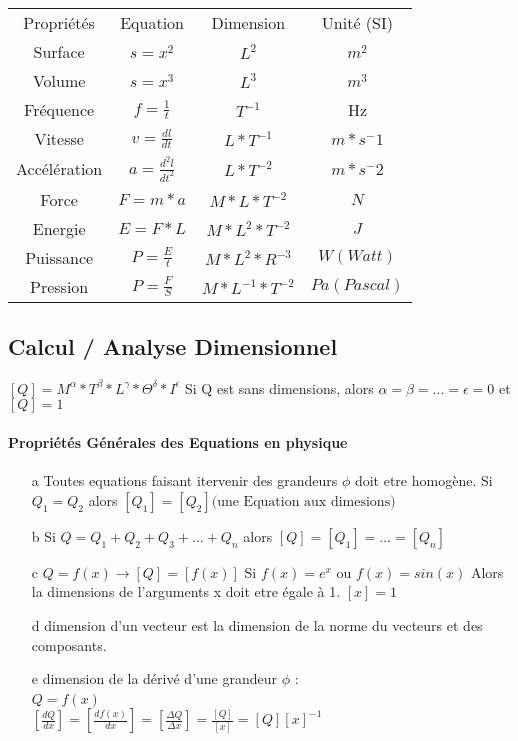 \begin{tabular}{|c|c|c|c|}
	Propriétés & Equation & Dimension & Unité (SI) \\
	Surface & $s=x^2$ &$ L^2$ & $m^2$\\
	Volume & $s=x^3$ &$ L^3$ & $m^3$\\
	Fréquence & $f=\frac{1}{t}$ & $T^{-1}$ & Hz \\
	Vitesse & $v=\frac{dl}{dt}$ & $L*T^{-1}$ & $m*s^-1$ \\
	Accélération& $a=\frac{d^2l}{dt^2}$ & $L*T^{-2}$ & $m*s^-2$ \\
	Force & $F=m*a$ & $M*L*T^{-2}$ & $N$ \\
	Energie & $E=F*L$ & $M*L^2*T^{-2}$ & $J$ \\
	Puissance & $P=\frac{E}{t}$ & $M*L^2*R^{-3}$ & $W (Watt)$ \\
	Pression & $P=\frac{F}{S}$ & $M*L^{-1}*T^{-2}$ & $Pa (Pascal)$
\end{tabular}

\subsection{Calcul / Analyse Dimensionnel}
$[Q] = M^\alpha * T^\beta * L^\gamma * \Theta^\delta * I^\epsilon$
Si Q est sans dimensions, alors $\alpha = \beta =...=\epsilon=0$ et 
$[Q]=1$

\paragraph{Propriétés Générales des Equations en physique}
\begin{itemize}
	\item[a] Toutes equations faisant itervenir des grandeurs $\phi$ doit etre homogène.
		Si $Q_1 = Q_2$ alors $[Q_1] = [Q_2] \text{(une Equation aux dimesions)}$
	\item[b] Si $Q=Q_1 + Q_2 + Q_3 + ... + Q_n$ alors $[Q]=[Q_1]=...=[Q_n]$
	\item[c] $Q = f(x) \rightarrow [Q] = [f(x)]$
		Si $f(x) = e^x$ ou  $f(x) = sin(x)$ Alors la dimensions de l'arguments x doit etre égale à 1. $[x] = 1$
	\item[d] dimension d'un vecteur est la dimension de la norme du vecteurs et des composants.
	\item[e] dimension de la dérivé d'une grandeur $\phi$ : ~\\
		$Q=f(x)$ ~\\
		$[\frac{dQ}{dx}] = [\frac{df(x)}{dx}]=[\frac{\Delta Q}{\Delta x}] = \frac{[Q]}{[x]} = [Q][x]^{-1}$
\end{itemize}


